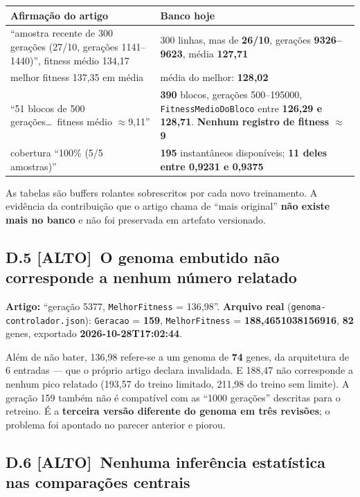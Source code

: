 \documentclass[11pt,a4paper]{article}
\newcommand{\alto}{\textbf{\color{orange!70!black}[ALTO]}}
\begin{document}
\begin{longtable}{|p{7.0cm}|p{7.6cm}|}
\hline
\textbf{Afirmação do artigo} & \textbf{Banco hoje} \\
\hline
\endhead
``amostra recente de 300 gerações (27/10, gerações 1141--1440)'', fitness médio 134,17 &
300 linhas, mas de \textbf{26/10}, gerações \textbf{9326--9623}, média \textbf{127,71} \\
\hline
melhor fitness 137,35 em média & média do melhor: \textbf{128,02} \\
\hline
``51 blocos de 500 gerações\ldots\ fitness médio $\approx$9,11'' &
\textbf{390} blocos, gerações 500--195000, \texttt{FitnessMedioDoBloco} entre \textbf{126,29 e
128,71}. \textbf{Nenhum registro de fitness $\approx$9} \\
\hline
cobertura ``100\% (5/5 amostras)'' &
\textbf{195} instantâneos disponíveis; \textbf{11 deles entre 0,9231 e 0,9375} \\
\hline
\end{longtable}

As tabelas são buffers rolantes sobrescritos por cada novo treinamento. A evidência da contribuição
que o artigo chama de ``mais original'' \textbf{não existe mais no banco} e não foi preservada em
artefato versionado.

\subsection*{D.5 \alto\ O genoma embutido não corresponde a nenhum número relatado}

\textbf{Artigo:} ``geração 5377, \texttt{MelhorFitness} = 136,98''.
\textbf{Arquivo real} (\texttt{genoma-controlador.json}): \texttt{Geracao} = \textbf{159},
\texttt{MelhorFitness} = \textbf{188,4651038156916}, \textbf{82} genes, exportado
\textbf{2026-10-28T17:02:44}.

Além de não bater, 136,98 refere-se a um genoma de \textbf{74} genes, da arquitetura de 6 entradas
--- que o próprio artigo declara invalidada. E 188,47 não corresponde a nenhum pico relatado (193,57
do treino limitado, 211,98 do treino sem limite). A geração 159 também não é compatível com as ``1000
gerações'' descritas para o retreino. É a \textbf{terceira versão diferente do genoma em três
revisões}; o problema foi apontado no parecer anterior e piorou.

\subsection*{D.6 \alto\ Nenhuma inferência estatística nas comparações centrais}
\end{document}

